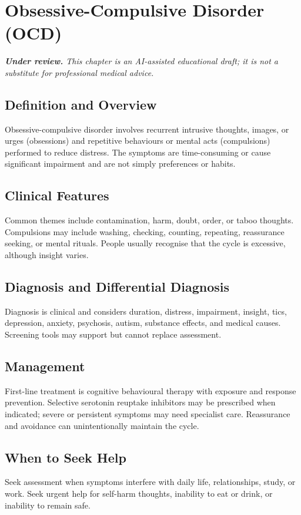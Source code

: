 \chapter{Obsessive-Compulsive Disorder (OCD)}

\medskip
\noindent\textit{\textbf{Under review.} This chapter is an AI-assisted educational draft; it is not a substitute for professional medical advice.}

\section*{Definition and Overview}
Obsessive-compulsive disorder involves recurrent intrusive thoughts, images, or urges (obsessions) and repetitive behaviours or mental acts (compulsions) performed to reduce distress. The symptoms are time-consuming or cause significant impairment and are not simply preferences or habits.

\section*{Clinical Features}
Common themes include contamination, harm, doubt, order, or taboo thoughts. Compulsions may include washing, checking, counting, repeating, reassurance seeking, or mental rituals. People usually recognise that the cycle is excessive, although insight varies.

\section*{Diagnosis and Differential Diagnosis}
Diagnosis is clinical and considers duration, distress, impairment, insight, tics, depression, anxiety, psychosis, autism, substance effects, and medical causes. Screening tools may support but cannot replace assessment.

\section*{Management}
First-line treatment is cognitive behavioural therapy with exposure and response prevention. Selective serotonin reuptake inhibitors may be prescribed when indicated; severe or persistent symptoms may need specialist care. Reassurance and avoidance can unintentionally maintain the cycle.

\section*{When to Seek Help}
Seek assessment when symptoms interfere with daily life, relationships, study, or work. Seek urgent help for self-harm thoughts, inability to eat or drink, or inability to remain safe.

